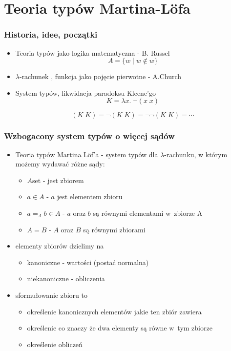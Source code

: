 \documentclass{beamer}
\begin{document}

\section{Teoria typów Martina-L\"{o}fa}

\begin{frame}
\frametitle{Historia, idee, początki}

\begin{itemize}
 \item Teoria typów jako logika matematyczna - B. Russel
 \[
  A = \{ w \mid w \not\in w \}
 \]
 \item $\lambda$-rachunek , funkcja jako pojęcie pierwotne  - A.Church
 \item System typów, likwidacja paradoksu Kleene'go
\[
 K = \lambda x.\; \neg (x\; x)
\]

\[
 (K\; K) = \neg (K\; K) = \neg \neg (K\; K) = \cdots
\]

\end{itemize}


\end{frame}


\begin{frame}
\frametitle{Wzbogacony system typów o więcej sądów}

\begin{itemize}
 \item Teoria typów Martina L\"{o}f'a - system typów dla $\lambda$-rachunku, w którym możemy wydawać różne sądy:
       
\begin{itemize}
 \item $A$\;set -  jest zbiorem
 \item $a \in A$ - $a$ jest elementem zbioru
 \item $a =_A b \in A$ - $a$ oraz $b$ są równymi elementami w~zbiorze A
 \item $A = B$ - $A$ oraz $B$ są równymi zbiorami
\end{itemize}

\item elementy zbiorów dzielimy na
\begin{itemize}
 \item kanoniczne - wartości (postać normalna)
 \item niekanoniczne - obliczenia 
\end{itemize}


\item sformułowanie zbioru to
\begin{itemize}
 \item określenie kanonicznych elementów jakie ten zbiór zawiera
 \item określenie co znaczy że dwa elementy są równe w~tym zbiorze
 \item określenie obliczeń
\end{itemize}

\end{itemize}


\end{frame}
\end{document}
